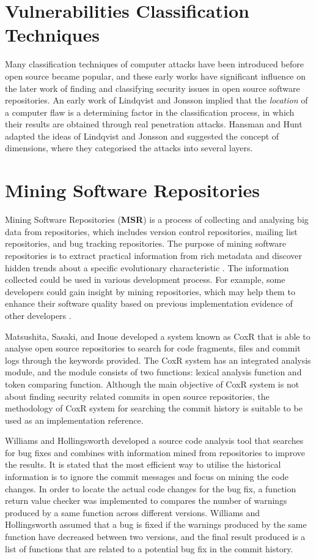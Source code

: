 \documentclass[12pt, a4paper]{report}
\begin{document}
{\section{Vulnerabilities Classification Techniques}
Many classification techniques of computer attacks have been introduced before open source became
popular, and these early works have significant influence on the later work of finding and
classifying security issues in open source software repositories. An early work of Lindqvist and
Jonsson \cite{lindqvist_1999} implied that the \textit{location} of a computer flaw is a determining
factor in the classification process, in which their results are obtained through real penetration
attacks. Hansman and Hunt \cite{hansman_2005} adapted the ideas of Lindqvist and Jonsson and
suggested the concept of dimensions, where they categorised the attacks into several layers.

\section{Mining Software Repositories}
Mining Software Repositories (\textbf{MSR}) is a process of collecting and analysing big data from
repositories, which includes version control repositories, mailing list repositories, and bug
tracking repositories. The purpose of mining software repositories is to extract practical
information from rich metadata and discover hidden trends about a specific evolutionary
characteristic \cite{kagdi_2007}. The information collected could be used in various development
process. For example, some developers could gain insight by mining repositories, which may help them
to enhance their software quality based on previous implementation evidence of other developers
\cite{hassan_2008}.

Matsushita, Sasaki, and Inoue \cite{matsushita_2005} developed a system known as CoxR that is able
to analyse open source repositories to search for code fragments, files and commit logs through the
keywords provided. The CoxR system has an integrated analysis module, and the module consists of two
functions: lexical analysis function and token comparing function. Although the main objective of
CoxR system is not about finding security related commits in open source repositories, the
methodology of CoxR system for searching the commit history is suitable to be used as an
implementation reference.

Williams and Hollingsworth \cite{williams_2005} developed a source code analysis tool that searches
for bug fixes and combines with information mined from repositories to improve the results. It is
stated that the most efficient way to utilise the historical information is to ignore the commit
messages and focus on mining the code changes. In order to locate the actual code changes for the
bug fix, a function return value checker was implemented to compares the number of warnings produced
by a same function across different versions. Williams and Hollingsworth assumed that a bug is fixed
if the warnings produced by the same function have decreased between two versions, and the final
result produced is a list of functions that are related to a potential bug fix in the commit
history.

}
\end{document}
